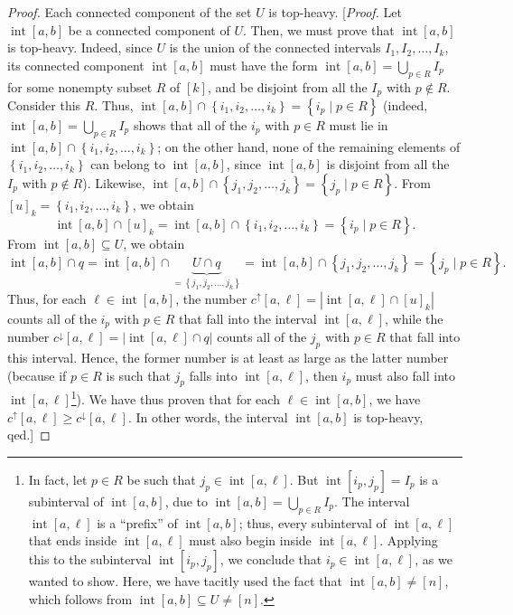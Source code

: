 \documentclass[reqno]{amsart}
\newcommand{\0}{\phantom{c}}
\DeclareMathOperator{\inter}{int} %
\let\cupnonlimits\bigcup
\renewcommand{\bigcup}{\cupnonlimits\limits}
\newenvironment{verlong}{}{}
\newcommand{\set}[1]{\left\{ #1 \right\}}
\newcommand{\abs}[1]{\left| #1 \right|}
\newcommand{\ive}[1]{\left[ #1 \right]}
\theoremstyle{plain}
\theoremstyle{definition}
\numberwithin{equation}{section}
\begin{document}
\begin{verlong}
\begin{proof}
Each connected component of the set $U$ is top-heavy.
[\textit{Proof.} Let $\inter[a,b]$ be a connected component of $U$. Then, we must prove that $\inter[a,b]$ is top-heavy.
Indeed, since $U$ is the union of the connected intervals $I_1, I_2, \ldots, I_k$, its connected component $\inter[a,b]$ must have the form $\inter[a,b] = \bigcup_{p \in R} I_p$ for some nonempty subset $R$ of $\ive{k}$, and be disjoint from all the $I_p$ with $p \notin R$. Consider this $R$.
Thus, $\inter[a,b] \cap \set{i_1, i_2, \ldots, i_k} = \set{i_p \mid p \in R}$ (indeed, $\inter[a,b] = \bigcup_{p \in R} I_p$ shows that all of the $i_p$ with $p \in R$ must lie in $\inter[a,b] \cap \set{i_1, i_2, \ldots, i_k}$; on the other hand, none of the remaining elements of $\set{i_1, i_2, \ldots, i_k}$ can belong to $\inter[a,b]$, since $\inter[a,b]$ is disjoint from all the $I_p$ with $p \notin R$).
Likewise, $\inter[a,b] \cap \set{j_1, j_2, \ldots, j_k} = \set{j_p \mid p \in R}$.
From $[u]_k = \set{i_1, i_2, \ldots, i_k}$, we obtain
\[
\inter[a,b] \cap [u]_k = \inter[a,b] \cap \set{i_1, i_2, \ldots, i_k} = \set{i_p \mid p \in R} .
\]
From $\inter[a,b] \subseteq U$, we obtain
\[
\inter[a,b] \cap q = \inter[a,b] \cap \underbrace{U \cap q}_{= \set{j_1, j_2, \ldots, j_k}}
= \inter[a,b] \cap \set{j_1, j_2, \ldots, j_k} = \set{j_p \mid p \in R} .
\]
Thus, for each $\ell \in \inter[a,b]$, the number $c^\uparrow[a,\ell] = \abs{\inter[a,\ell] \cap [u]_k}$ counts all of the $i_p$ with $p \in R$ that fall into the interval $\inter[a,\ell]$, while the number $c^\downarrow[a,\ell] = \abs{\inter[a,\ell] \cap q}$ counts all of the $j_p$ with $p \in R$ that fall into this interval.
Hence, the former number is at least as large as the latter number (because if $p \in R$ is such that $j_p$ falls into $\inter[a,\ell]$, then $i_p$ must also fall into $\inter[a,\ell]$\footnote{In fact, let $p \in R$ be such that $j_p \in \inter[a,\ell]$. But $\inter[i_p,j_p] = I_p$ is a subinterval of $\inter[a,b]$, due to $\inter[a,b] = \bigcup_{p \in R} I_p$. The interval $\inter[a,\ell]$ is a ``prefix'' of $\inter[a,b]$; thus, every subinterval of $\inter[a,\ell]$ that ends inside $\inter[a,\ell]$ must also begin inside $\inter[a,\ell]$. Applying this to the subinterval $\inter[i_p, j_p]$, we conclude that $i_p \in \inter[a,\ell]$, as we wanted to show. Here, we have tacitly used the fact that $\inter[a,b] \neq \ive{n}$, which follows from $\inter[a,b] \subseteq U \neq \ive{n}$.}).
We have thus proven that for each $\ell \in \inter[a,b]$, we have $c^\uparrow[a,\ell] \geq c^\downarrow[a,\ell]$. In other words, the interval $\inter[a,b]$ is top-heavy, qed.]


\end{proof}
\end{verlong}
\end{document}

